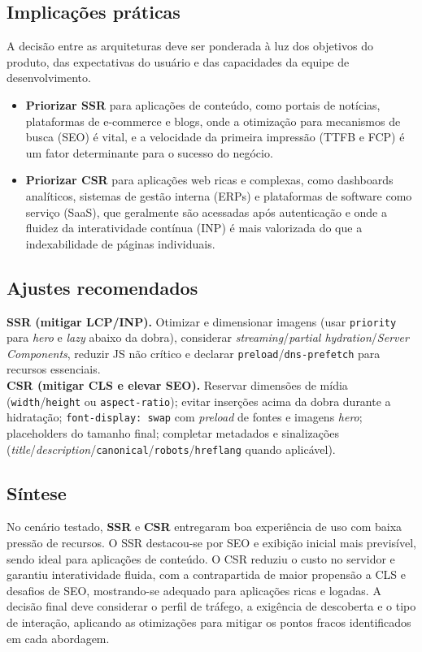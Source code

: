 \subsection{Implicações práticas}
A decisão entre as arquiteturas deve ser ponderada à luz dos objetivos do produto, das expectativas do usuário e das capacidades da equipe de desenvolvimento.
\begin{itemize}
    \item \textbf{Priorizar SSR} para aplicações de conteúdo, como portais de notícias, plataformas de e-commerce e blogs, onde a otimização para mecanismos de busca (SEO) é vital, e a velocidade da primeira impressão (TTFB e FCP) é um fator determinante para o sucesso do negócio.
    \item \textbf{Priorizar CSR} para aplicações web ricas e complexas, como dashboards analíticos, sistemas de gestão interna (ERPs) e plataformas de software como serviço (SaaS), que geralmente são acessadas após autenticação e onde a fluidez da interatividade contínua (INP) é mais valorizada do que a indexabilidade de páginas individuais.
\end{itemize}

\subsection{Ajustes recomendados}
\textbf{SSR (mitigar LCP/INP).} Otimizar e dimensionar imagens (usar \texttt{priority} para \emph{hero} e \emph{lazy} abaixo da dobra), considerar \emph{streaming}/\emph{partial hydration}/\emph{Server Components}, reduzir JS não crítico e declarar \texttt{preload}/\texttt{dns-prefetch} para recursos essenciais. \\
\textbf{CSR (mitigar CLS e elevar SEO).} Reservar dimensões de mídia (\texttt{width}/\texttt{height} ou \texttt{aspect-ratio}); evitar inserções acima da dobra durante a hidratação; \texttt{font-display: swap} com \emph{preload} de fontes e imagens \emph{hero}; placeholders do tamanho final; completar metadados e sinalizações (\emph{title}/\emph{description}/\texttt{canonical}/\texttt{robots}/\texttt{hreflang} quando aplicável).

\subsection{Síntese}
No cenário testado, \textbf{SSR} e \textbf{CSR} entregaram boa experiência de uso com baixa pressão de recursos. O SSR destacou-se por SEO e exibição inicial mais previsível, sendo ideal para aplicações de conteúdo. O CSR reduziu o custo no servidor e garantiu interatividade fluida, com a contrapartida de maior propensão a CLS e desafios de SEO, mostrando-se adequado para aplicações ricas e logadas. A decisão final deve considerar o perfil de tráfego, a exigência de descoberta e o tipo de interação, aplicando as otimizações para mitigar os pontos fracos identificados em cada abordagem.